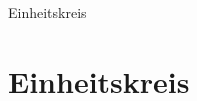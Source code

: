 \documentclass{standalone}
\begin{document}
\begin{frame}
  \begin{center}
    Einheitskreis
  \end{center}
  \section{Einheitskreis}
\end{frame}










\end{document}
